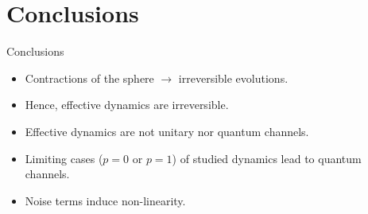 \section{Conclusions}

\begin{frame}{Conclusions}
    \begin{itemize}
        \item Contractions of the sphere $\rightarrow$ irreversible evolutions.
        \item Hence, effective dynamics are irreversible.
        \item Effective dynamics are not unitary nor quantum channels.
        \item Limiting cases ($p=0$ or $p=1$) of studied dynamics lead to quantum channels.
        \item Noise terms induce non-linearity.
    \end{itemize}
\end{frame}